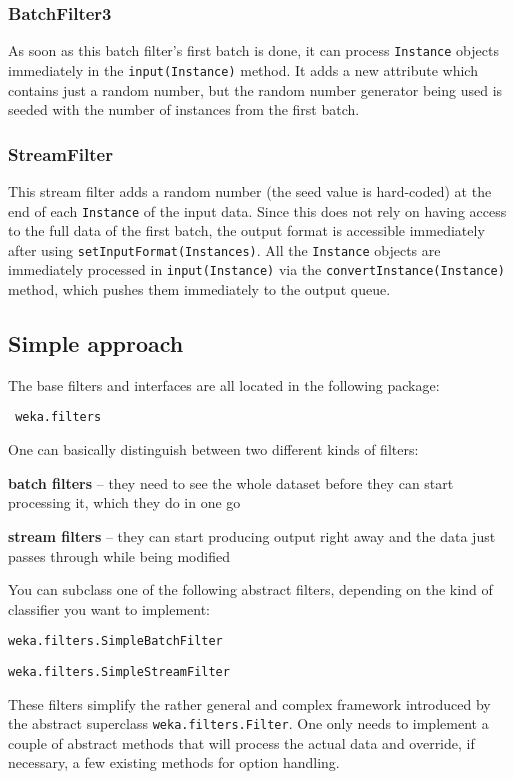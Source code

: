 {\scriptsize }

\newpage
\subsubsection*{BatchFilter3}
As soon as this batch filter's first batch is done, it can process
\texttt{Instance} objects immediately in the \texttt{input(Instance)} method. It
adds a new attribute which contains just a random number, but the random number
generator being used is seeded with the number of instances from the first
batch.

{\scriptsize }

\newpage
\subsubsection*{StreamFilter}
This stream filter adds a random number (the seed value is hard-coded) at the
end of each \texttt{Instance} of the input data. Since this does not rely on
having access to the full data of the first batch, the output format is
accessible immediately after using \texttt{setInputFormat(Instances)}. All the
\texttt{Instance} objects are immediately processed in \texttt{input(Instance)}
via the \texttt{convertInstance(Instance)} method, which pushes them immediately
to the output queue.

{\scriptsize }

\newpage
\subsection{Simple approach}
The base filters and interfaces are all located in the following package:
\begin{verbatim}
 weka.filters
\end{verbatim}
One can basically distinguish between two different kinds of filters:
\begin{tight_itemize}
  \item \textbf{batch filters} -- they need to see the whole dataset before they
can start processing it, which they do in one go
  \item \textbf{stream filters} -- they can start producing output right away
and the data just passes through while being modified
\end{tight_itemize}
You can subclass one of the following abstract filters, depending on the kind of
classifier you want to implement:
\begin{tight_itemize}
  \item \texttt{weka.filters.SimpleBatchFilter}
  \item \texttt{weka.filters.SimpleStreamFilter}
\end{tight_itemize}
These filters simplify the rather general and complex framework introduced by
the abstract superclass \texttt{weka.filters.Filter}. One only needs to
implement a couple of abstract methods that will process the actual data and
override, if necessary, a few existing methods for option handling.

